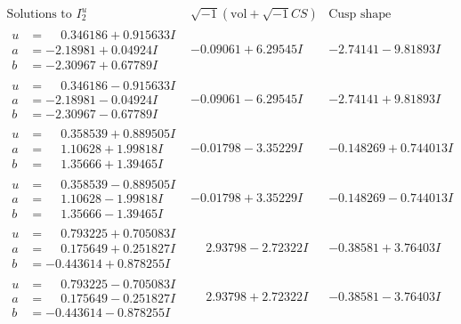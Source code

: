 \documentclass[1p]{elsarticle_modified}
\theoremstyle{definition}
\newcommand{\I}{\sqrt{-1}}
\begin{document}
$$\begin{array}{c|c|c}  
\text{Solutions to }I^u_{2}& \I (\text{vol} + \sqrt{-1}CS) & \text{Cusp shape}\\
 \hline 
\begin{aligned}
u &= \phantom{-}0.346186 + 0.915633 I \\
a &= -2.18981 + 0.04924 I \\
b &= -2.30967 + 0.67789 I\end{aligned}
 & -0.09061 + 6.29545 I & -2.74141 - 9.81893 I \\ \hline\begin{aligned}
u &= \phantom{-}0.346186 - 0.915633 I \\
a &= -2.18981 - 0.04924 I \\
b &= -2.30967 - 0.67789 I\end{aligned}
 & -0.09061 - 6.29545 I & -2.74141 + 9.81893 I \\ \hline\begin{aligned}
u &= \phantom{-}0.358539 + 0.889505 I \\
a &= \phantom{-}1.10628 + 1.99818 I \\
b &= \phantom{-}1.35666 + 1.39465 I\end{aligned}
 & -0.01798 - 3.35229 I & -0.148269 + 0.744013 I \\ \hline\begin{aligned}
u &= \phantom{-}0.358539 - 0.889505 I \\
a &= \phantom{-}1.10628 - 1.99818 I \\
b &= \phantom{-}1.35666 - 1.39465 I\end{aligned}
 & -0.01798 + 3.35229 I & -0.148269 - 0.744013 I \\ \hline\begin{aligned}
u &= \phantom{-}0.793225 + 0.705083 I \\
a &= \phantom{-}0.175649 + 0.251827 I \\
b &= -0.443614 + 0.878255 I\end{aligned}
 & \phantom{-}2.93798 - 2.72322 I & -0.38581 + 3.76403 I \\ \hline\begin{aligned}
u &= \phantom{-}0.793225 - 0.705083 I \\
a &= \phantom{-}0.175649 - 0.251827 I \\
b &= -0.443614 - 0.878255 I\end{aligned}
 & \phantom{-}2.93798 + 2.72322 I & -0.38581 - 3.76403 I \\ \hline\begin{aligned}

\end{aligned}
\end{array}$$
\end{document}
